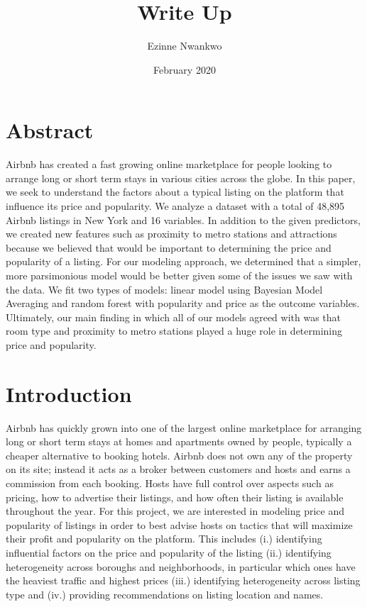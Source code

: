 \documentclass{article}
\title{Write Up}
\author{Ezinne Nwankwo}
\date{February 2020}
\begin{document}
\maketitle


\section{Abstract} 

Airbnb has created a fast growing online marketplace for people looking to arrange long or short term stays in various cities across the globe. In this paper, we seek to understand the factors about a typical listing on the platform that influence its price and popularity. We analyze a dataset with a total of 48,895 Airbnb listings in New York and 16 variables. In addition to the given predictors, we created new features such as proximity to metro stations and attractions because we believed that would be important to determining the price and popularity of a listing. For our modeling approach, we determined that a simpler, more parsimonious model would be better given some of the issues we saw with the data. We fit two types of models: linear model using Bayesian Model Averaging and random forest with popularity and price as the outcome variables. Ultimately, our main finding in which all of our models agreed with was that room type and proximity to metro stations played a huge role in determining price and popularity. 

\section{Introduction}

Airbnb has quickly grown into one of the largest online marketplace for arranging long or short term stays at homes and apartments owned by people, typically a cheaper alternative to booking hotels. Airbnb does not own any of the property on its site; instead it acts as a broker between customers and hosts and earns a commission from each booking. Hosts have full control over aspects such as pricing, how to advertise their listings, and how often their listing is available throughout the year. For this project, we are interested in modeling price and popularity of listings in order to best advise hosts on tactics that will maximize their profit and popularity on the platform. This includes (i.) identifying influential factors on the price and popularity of the listing (ii.) identifying heterogeneity across boroughs and neighborhoods, in particular which ones have the heaviest traffic and highest prices (iii.) identifying heterogeneity across listing type and (iv.) providing recommendations on listing location and names. 
\end{document}
